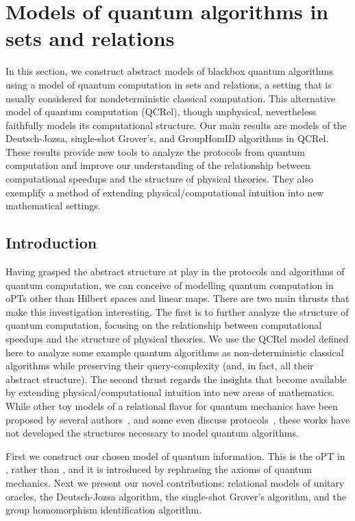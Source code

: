 \section{Models of quantum algorithms in sets and relations}
\label{sec:qalgrel}

        In this section, we construct abstract models of blackbox quantum algorithms using a model of quantum computation in sets and relations, a setting that is usually considered for nondeterministic classical computation.  This alternative model of quantum computation (QCRel), though unphysical, nevertheless faithfully models its computational structure.  Our main results are models of the Deutsch-Jozsa, single-shot Grover's, and GroupHomID algorithms in QCRel. These results provide new tools to analyze the protocols from quantum computation and improve our understanding of the relationship between computational speedups and the structure of physical theories. They also exemplify a method of extending physical/computational intuition into new mathematical settings.

\subsection{Introduction}

Having grasped the abstract structure at play in the protocols and algorithms of quantum computation, we can conceive of modelling quantum computation in oPTs other than Hilbert spaces and linear maps.  There are two main thrusts that make this investigation interesting.  The first is to further analyze the structure of quantum computation, focusing on the relationship between computational speedups and the structure of physical theories. We use the QCRel model defined here to analyze some example quantum algorithms as non-deterministic classical algorithms while preserving their query-complexity (and, in fact, all their abstract structure). The second thrust regards the insights that become available by extending physical/computational intuition into new areas of mathematics. While other toy models of a relational flavor for quantum mechanics have been proposed by several authors~\cite{ellermanModelQM,discreteQT,modalQT,spekk}, and some even discuss protocols~\cite{QCFF_James}, these works have not developed the structures necessary to model quantum algorithms.

First we construct our chosen model of quantum information.  This is the oPT in , rather than , and it is introduced by rephrasing the axioms of quantum mechanics. Next we present our novel contributions: relational models of unitary oracles, the Deutsch-Jozsa algorithm, the single-shot Grover's algorithm, and the group homomorphism identification algorithm.

